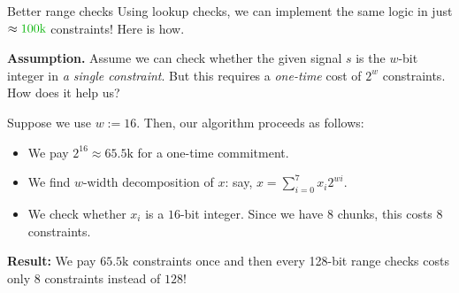 \documentclass{zkdl-presentation-template}
\begin{document}
    \begin{frame}{Better range checks}
        Using lookup checks, we can implement the same logic in just
        $\approx\textcolor{green!70!black}{100\text{k}}$ constraints! Here is
        how.\pause

        \textbf{Assumption.} Assume we can check whether the given signal $s$ is
        the $w$-bit integer in \textit{a single constraint}. But this requires 
        a \textit{one-time} cost of $2^w$ constraints. How does it help us?\pause

        Suppose we use $w := 16$. Then, our algorithm proceeds as follows:\pause
        \begin{itemize}
            \item We pay $2^{16} \approx 65.5\text{k}$ for a one-time commitment.\pause
            \item We find $w$-width decomposition of $x$: say, $x = \sum_{i=0}^{7}x_i2^{wi}$.\pause
            \item We check whether $x_i$ is a $16$-bit integer. Since we have $8$ chunks,
            this costs $8$ constraints.\pause
        \end{itemize}

        \textbf{Result:} We pay $65.5\text{k}$ constraints once and then every 
        128-bit range checks costs only $8$ constraints instead of $128$!
    \end{frame}
\end{document}
